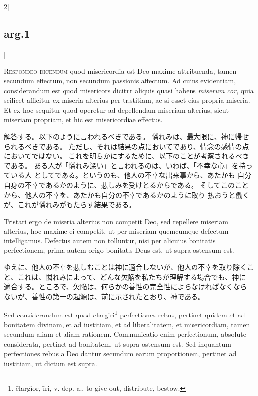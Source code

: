 \documentclass[paper=a4paper,fontsize=10pt,jafontsize=9pt,titlepage]{jlreq}
\begin{document}
\begin{paracol}{2}[\subsection{arg.1}]

{\scshape Respondeo dicendum} quod misericordia est Deo
maxime attribuenda, tamen secundum effectum, non secundum passionis
affectum. Ad cuius evidentiam, considerandum est quod misericors dicitur
aliquis quasi habens {\itshape miserum cor}, quia scilicet afficitur ex miseria
alterius per tristitiam, ac si esset eius propria miseria. 
Et ex hoc
sequitur quod operetur ad depellendam miseriam alterius, sicut miseriam
propriam, et hic est misericordiae effectus.

\switchcolumn

解答する。以下のように言われるべきである。
憐れみは、最大限に、神に帰せられるべきである。
ただし、それは結果の点においてであり、情念の感情の点においてではない。
これを明らかにするために、以下のことが考察されるべきである。
ある人が「憐れみ深い」と言われるのは、いわば、「不幸な心」を持っている人
 としてである。というのも、他人の不幸な出来事から、あたかも
 自分自身の不幸であるかのように、悲しみを受けとるからである。
そしてこのことから、他人の不幸を、あたかも自分の不幸であるかのように取り
 払おうと働くが、これが憐れみがもたらす結果である。

\switchcolumn*

Tristari ergo de miseria
alterius non competit Deo, sed repellere miseriam alterius, hoc maxime
ei competit, ut per miseriam quemcumque defectum intelligamus. Defectus
autem non tolluntur, nisi per alicuius bonitatis perfectionem, prima
autem origo bonitatis Deus est, ut supra ostensum est.

\switchcolumn

ゆえに、他人の不幸を悲しむことは神に適合しないが、他人の不幸を取り除くこ
 と、これは、憐れみによって、どんな欠陥を私たちが理解する場合でも、神に
 適合する。ところで、欠陥は、何らかの善性の完全性によらなければなくなら
 ないが、善性の第一の起源は、前に示されたとおり、神である。

\switchcolumn*

Sed considerandum
est quod elargiri\footnote{\={e}larg\u{\i}or, \={\i}ri, v. dep. a., to give out, distribute, bestow.} perfectiones rebus, pertinet quidem et ad bonitatem
divinam, et ad iustitiam, et ad liberalitatem, et misericordiam, tamen
secundum aliam et aliam rationem. Communicatio enim perfectionum,
absolute considerata, pertinet ad bonitatem, ut supra ostensum est. Sed
inquantum perfectiones rebus a Deo dantur secundum earum proportionem,
pertinet ad iustitiam, ut dictum est supra.


\end{paracol}
\end{document}
